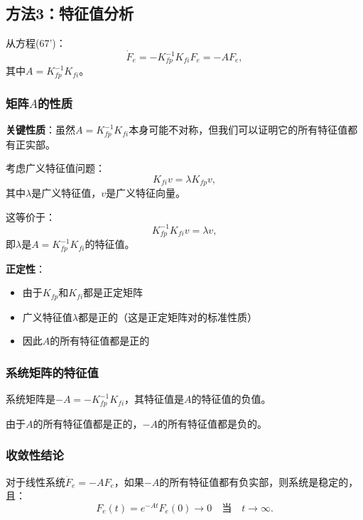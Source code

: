 \documentclass{article}
\begin{document}
\subsection{方法3：特征值分析}

从方程(67')：
\begin{equation}
\dot{F}_e = -K_{fp}^{-1}K_{fi}F_e = -A F_e,
\end{equation}
其中$A = K_{fp}^{-1}K_{fi}$。

\subsubsection{矩阵$A$的性质}

\textbf{关键性质}：虽然$A = K_{fp}^{-1}K_{fi}$本身可能不对称，但我们可以证明它的所有特征值都有正实部。

考虑广义特征值问题：
\begin{equation}
K_{fi}v = \lambda K_{fp}v,
\end{equation}
其中$\lambda$是广义特征值，$v$是广义特征向量。

这等价于：
\begin{equation}
K_{fp}^{-1}K_{fi}v = \lambda v,
\end{equation}
即$\lambda$是$A = K_{fp}^{-1}K_{fi}$的特征值。

\textbf{正定性}：
\begin{itemize}
\item 由于$K_{fp}$和$K_{fi}$都是正定矩阵
\item 广义特征值$\lambda$都是正的（这是正定矩阵对的标准性质）
\item 因此$A$的所有特征值都是正的
\end{itemize}

\subsubsection{系统矩阵的特征值}

系统矩阵是$-A = -K_{fp}^{-1}K_{fi}$，其特征值是$A$的特征值的负值。

由于$A$的所有特征值都是正的，$-A$的所有特征值都是负的。

\subsubsection{收敛性结论}

对于线性系统$\dot{F}_e = -A F_e$，如果$-A$的所有特征值都有负实部，则系统是稳定的，且：
\begin{equation}
F_e(t) = e^{-At}F_e(0) \to 0 \quad \text{当} \quad t \to \infty.
\end{equation}
\end{document}
